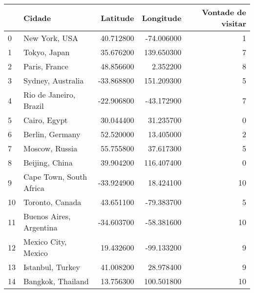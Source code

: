 \begin{tabular}{llrrr}
\toprule
 & Cidade & Latitude & Longitude & Vontade de visitar \\
\midrule
0 & New York, USA & 40.712800 & -74.006000 & 1 \\
1 & Tokyo, Japan & 35.676200 & 139.650300 & 7 \\
2 & Paris, France & 48.856600 & 2.352200 & 8 \\
3 & Sydney, Australia & -33.868800 & 151.209300 & 5 \\
4 & Rio de Janeiro, Brazil & -22.906800 & -43.172900 & 7 \\
5 & Cairo, Egypt & 30.044400 & 31.235700 & 0 \\
6 & Berlin, Germany & 52.520000 & 13.405000 & 2 \\
7 & Moscow, Russia & 55.755800 & 37.617300 & 5 \\
8 & Beijing, China & 39.904200 & 116.407400 & 0 \\
9 & Cape Town, South Africa & -33.924900 & 18.424100 & 10 \\
10 & Toronto, Canada & 43.651100 & -79.383700 & 5 \\
11 & Buenos Aires, Argentina & -34.603700 & -58.381600 & 10 \\
12 & Mexico City, Mexico & 19.432600 & -99.133200 & 9 \\
13 & Istanbul, Turkey & 41.008200 & 28.978400 & 9 \\
14 & Bangkok, Thailand & 13.756300 & 100.501800 & 10 \\
\bottomrule
\end{tabular}
